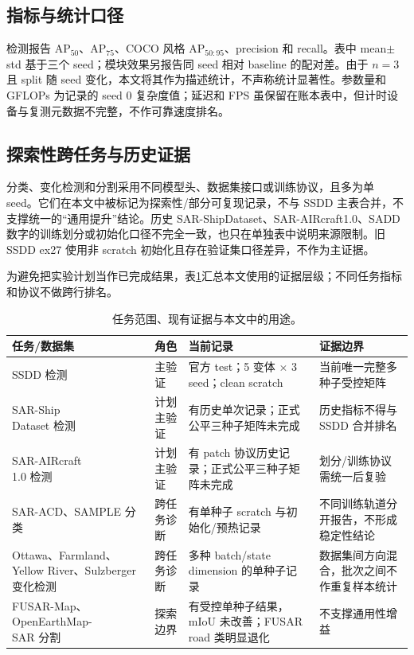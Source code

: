 \documentclass[UTF8,12pt,a4paper]{ctexart}
\begin{document}
\subsection{指标与统计口径}
检测报告 AP$_{50}$、AP$_{75}$、COCO 风格 AP$_{50:95}$、precision 和 recall。表中 mean$\pm$std 基于三个 seed；模块效果另报告同 seed 相对 baseline 的配对差。由于 $n=3$ 且 split 随 seed 变化，本文将其作为描述统计，不声称统计显著性。参数量和 GFLOPs 为记录的 seed 0 复杂度值；延迟和 FPS 虽保留在账本表中，但计时设备与复测元数据不完整，不作可靠速度排名。

\subsection{探索性跨任务与历史证据}
分类、变化检测和分割采用不同模型头、数据集接口或训练协议，且多为单 seed。它们在本文中被标记为探索性/部分可复现记录，不与 SSDD 主表合并，不支撑统一的“通用提升”结论。历史 SAR-ShipDataset、SAR-AIRcraft1.0、SADD 数字的训练划分或初始化口径不完全一致，也只在单独表中说明来源限制。旧 SSDD ex27 使用非 scratch 初始化且存在验证集口径差异，不作为主证据。

为避免把实验计划当作已完成结果，表\ref{tab:evidence_scope}汇总本文使用的证据层级；不同任务指标和协议不做跨行排名。
\begin{table}[H]\centering\scriptsize
\caption{任务范围、现有证据与本文中的用途。}
\label{tab:evidence_scope}
\begin{tabularx}{\linewidth}{p{2.1cm}p{2.4cm}p{4.8cm}X}
\toprule
任务/数据集 & 角色 & 当前记录 & 证据边界\\
\midrule
SSDD 检测 & 主验证 & 官方 test；5 变体 $\times$ 3 seed；clean scratch & 当前唯一完整多种子受控矩阵\\
\shortstack[l]{SAR-Ship\\Dataset} 检测 & 计划主验证 & 有历史单次记录；正式公平三种子矩阵未完成 & 历史指标不得与 SSDD 合并排名\\
\shortstack[l]{SAR-AIRcraft\\1.0} 检测 & 计划主验证 & 有 patch 协议历史记录；正式公平三种子矩阵未完成 & 划分/训练协议需统一后复验\\
SAR-ACD、SAMPLE 分类 & 跨任务诊断 & 有单种子 scratch 与初始化/预热记录 & 不同训练轨道分开报告，不形成稳定性结论\\
Ottawa、Farmland、Yellow River、Sulzberger 变化检测 & 跨任务诊断 & 多种 batch/state dimension 的单种子记录 & 数据集间方向混合，批次之间不作重复样本统计\\
FUSAR-Map、\shortstack[l]{OpenEarthMap-\\SAR} 分割 & 探索边界 & 有受控单种子结果，mIoU 未改善；FUSAR road 类明显退化 & 不支撑通用性增益\\
\bottomrule
\end{tabularx}
\end{table}
\end{document}
